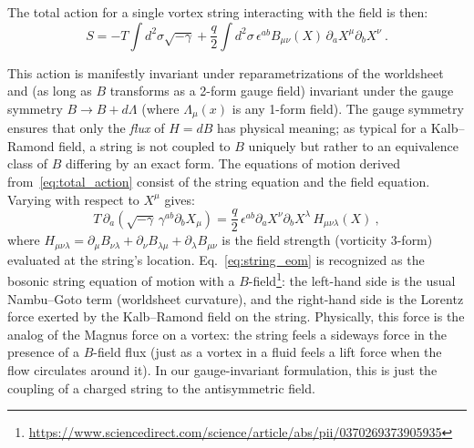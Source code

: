 \documentclass[12pt]{article}
\begin{document}
The total action for a single vortex string interacting with the field is then:
\begin{equation}
S = -T \int d^2\sigma \sqrt{-\gamma} + \frac{q}{2}\int d^2\sigma\, \epsilon^{ab} B_{\mu\nu}(X)\, \partial_a X^\mu \partial_b X^\nu~.
\label{eq:total_action}
\end{equation}

This action is manifestly invariant under reparametrizations of the worldsheet and (as long as $B$ transforms as a 2-form gauge field) invariant under the gauge symmetry $B \to B + d\Lambda$ (where $\Lambda_\mu(x)$ is any 1-form field). The gauge symmetry ensures that only the \textit{flux} of $H=dB$ has physical meaning; as typical for a Kalb--Ramond field, a string is not coupled to $B$ uniquely but rather to an equivalence class of $B$ differing by an exact form. The equations of motion derived from~\eqref{eq:total_action} consist of the string equation and the field equation. Varying with respect to $X^\mu$ gives:
\begin{equation}
T\, \partial_a\left(\sqrt{-\gamma}\, \gamma^{ab} \partial_b X_\mu\right) = \frac{q}{2}\, \epsilon^{ab} \partial_a X^\nu \partial_b X^\lambda\, H_{\mu\nu\lambda}(X)~,
\label{eq:string_eom}
\end{equation}
where $H_{\mu\nu\lambda} = \partial_\mu B_{\nu\lambda} + \partial_\nu B_{\lambda\mu} + \partial_\lambda B_{\mu\nu}$ is the field strength (vorticity 3-form) evaluated at the string's location. Eq.~\eqref{eq:string_eom} is recognized as the bosonic string equation of motion with a $B$-field\footnote{\url{https://www.sciencedirect.com/science/article/abs/pii/0370269373905935}}: the left-hand side is the usual Nambu--Goto term (worldsheet curvature), and the right-hand side is the Lorentz force exerted by the Kalb--Ramond field on the string. Physically, this force is the analog of the Magnus force on a vortex: the string feels a sideways force in the presence of a $B$-field flux (just as a vortex in a fluid feels a lift force when the flow circulates around it). In our gauge-invariant formulation, this is just the coupling of a charged string to the antisymmetric field.
\end{document}

